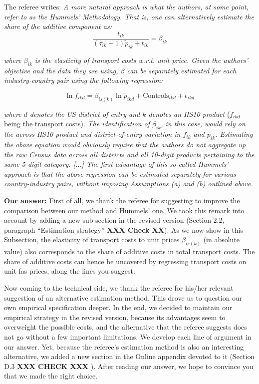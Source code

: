 \documentclass[a4paper,11pt]{article}
\begin{document}
The referee writes: \textit{A more natural approach is what the authors, at some point, refer to as the Hummels' Methodology. That is, one can alternatively estimate the share of the additive component as:}
$$\frac{t_{ik}}{ (\tau_{ik}-1)\tilde{p}_{ik} + t_{ik}} = \beta_{ik}$$

\textit{where $\beta_{ik}$ is the elasticity of transport costs w.r.t. unit price. Given the authors' objective and the data they are using, $\beta$ can be separately estimated for each industry-country pair using the following regression:}

\begin{equation}
\ln f_{ikd} = \beta_{is(k)}\ln \tilde{p}_{ikd} + \text{Controls}_{ikd} +\epsilon_{ikd} \label{eq:estimation_ref1}
\end{equation}

\textit{where $d$ denotes the US district of entry and $k$ denotes an HS10 product} ($f_{ikd}$ being the transport costs). \textit{The
identification of $\beta_{ik}$, in this case, would rely on the across HS10 product and
district-of-entry variation in $f_{ik}$ and $p_{ik}$. Estimating the above equation would
obviously require that the authors do not aggregate up the raw Census data
across all districts and all 10-digit products pertaining to the same 5-digit category. [...] The first advantage of this so-called Hummels' approach is that the above regression can be estimated separately for various country-industry pairs, without imposing Assumptions (a) and (b) outlined above.}

\textbf{Our answer:} First of all, we thank the referee for suggesting to improve the comparison between our method and Hummels' one. We took this remark into account by adding a new sub-section in the revised version (Section 2.2, paragraph ``Estimation strategy'' \textbf{XXX Check XX}). As we now show in this Subsection, the elasticity of transport costs to unit prices $\beta_{is(k)}$ (in absolute value) also corresponds to the share of additive costs in total transport costs. The share of additive costs can hence be uncovered by regressing transport costs on unit fas prices, along the lines you suggest.

Now coming to the technical side, we thank the referee for his/her relevant suggestion of an alternative estimation method. This drove us to question our own empirical specification deeper. In the end, we decided to maintain our empirical strategy in the revised version, because its advantages seem to overweight the possible costs, and the alternative that the referee suggests does not go without a few important limitations. We develop each line of argument in our answer. Yet, because the referee's estimation method is also an interesting alternative, we added a new section in the Online appendix devoted to it (Section D.3 \textbf{XXX CHECK XXX }). After reading our answer, we hope to convince you that we made the right choice.
\end{document}
